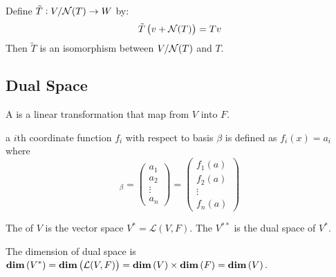 \begin{theorem}
    Define $\tilde{T}: V/\mathcal{N}(T) \rightarrow W$ by:
    \begin{equation*}
        \tilde{T}\left(v + \mathcal{N}(T) \right) = Tv
    \end{equation*}
    Then $\tilde{T}$ is an isomorphism between $V/\mathcal{N}(T)$ and $T$.
\end{theorem}



\subsection{Dual Space}


\begin{definition}
	A  is a linear transformation that map from $V$ into $F$.
\end{definition}

\begin{definition}
	a $i$th coordinate function $f_i$ with respect to basis $\beta$ is defined as $f_i(x) = a_i$ where
	\begin{equation*}
		[x]_\beta = \begin{pmatrix}
			a_1 \\
			a_2 \\
			\vdots \\
			a_n
		\end{pmatrix} = \begin{pmatrix}
			f_1(a) \\
			f_2(a) \\
			\vdots \\
			f_n(a)
		\end{pmatrix}
	\end{equation*}
\end{definition}



\begin{definition}
	The  of $V$ is the vector space $V^* = \mathcal{L}(V,F)$. The  $V^{**}$ is the dual space of $V^*$.
\end{definition}


The dimension of dual space is $\displaystyle \mathbf{dim}\left( V^* \right) = \displaystyle \mathbf{dim}\left( \mathcal{L}(V,F) \right) = \displaystyle \mathbf{dim}\left( V \right) \times \displaystyle \mathbf{dim}\left( F \right) = \displaystyle \mathbf{dim}\left( V \right)$.

